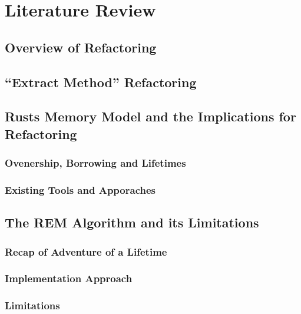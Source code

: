 \chapter[Chapter 1]{Literature Review}
\label{chap:lit_review}

\section{Overview of Refactoring}
\label{sec:overview_refactoring}

\section{``Extract Method'' Refactoring}
\label{sec:extract_method}

\section{Rusts Memory Model and the Implications for Refactoring}
\label{sec:rust_memory_model}

\subsection{Ovenership, Borrowing and Lifetimes}
\label{sec:ownership_borrowing_lifetimes}

\subsection{Existing Tools and Apporaches}
\label{sec:existing_tools_approaches}

\section{The REM Algorithm and its Limitations}
\label{sec:rem_algorithm_limitations}

\subsection{Recap of Adventure of a Lifetime}
\label{sec:recap_adventure_lifetime}

\subsection{Implementation Approach}
\label{sec:implementation_approach}

\subsection{Limitations}
\label{sec:limitations_of_aol}


